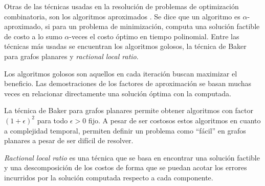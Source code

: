 \documentclass[a4paper,12pt]{book}
\begin{document}
	Otras de las técnicas usadas en la resolución de problemas de optimización combinatoria, son los algoritmos aproximados \cite{vasiliev2018algoritmos}. Se dice que un algoritmo es $\alpha$-aproximado, si para un problema de minimización, computa una solución factible de costo a lo sumo $\alpha$-veces el costo óptimo en tiempo polinomial. Entre las técnicas más usadas se encuentran los algoritmos golosos, la técnica de Baker para grafos planares y \emph{ractional local ratio}.
	
	Los algoritmos golosos son aquellos en cada iteración buscan maximizar el beneficio. Las demostraciones de los factores de aproximación se basan muchas veces en relacionar directamente una solución óptima con la computada.
	
	La técnica de Baker para grafos planares permite obtener algoritmos con factor $(1+ \epsilon)^2$ para todo $\epsilon > 0$ fijo. A pesar de ser costosos estos algoritmos en cuanto a complejidad temporal, permiten definir un problema como “fácil” en grafos planares a pesar de ser difícil de resolver.
	
	\emph{Ractional local ratio} es una técnica que se basa en encontrar una solución factible y una descomposición de los costos de forma que se puedan acotar los errores incurridos por la solución computada respecto a cada componente.
	
\end{document}
